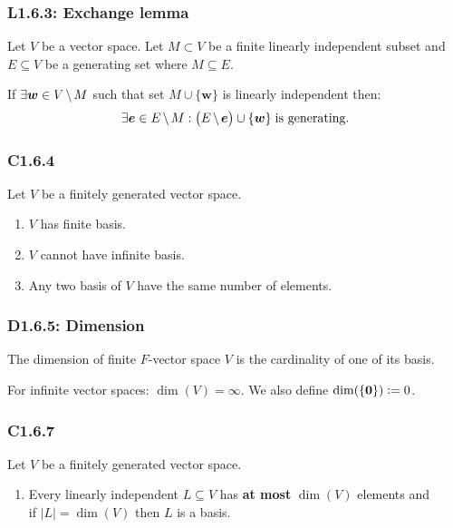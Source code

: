 \documentclass{article}
\newcommand{\deq}{\vcentcolon=}
\newcommand{\vc}[1]{\boldsymbol{#1}}
\begin{document}
\begin{multicols*}{3}
\subsubsection*{L1.6.3: Exchange lemma}
Let $V$ be a vector space. Let $M\subset V$ be a finite
linearly independent subset and $E\subseteq V$
be a generating set where $M\subseteq E$.

If $\exists\vc{w}\in V\hspace{0.02in}\backslash\hspace{0.02in} M$
such that set $M\cup\{\vc{w}\}$ is linearly independent then:
$$\exists\vc{e}\in E\hspace{0.02in}\backslash\hspace{0.02in} M:
\bigl(E\hspace{0.02in}\backslash\hspace{0.02in}
\vc{e}\bigr)\cup\{\vc{w}\}\hspace{0.04in}\text{is generating.}$$

\subsubsection*{C1.6.4}
Let $V$ be a finitely generated vector space.
\begin{enumerate}
    \item $V$ has finite basis.
    
    \item $V$ cannot have infinite basis.
    
    \item Any two basis of $V$ have the
    same number of elements.
\end{enumerate}

\subsubsection*{D1.6.5: Dimension}
The dimension of finite $F$-vector space $V$ is the
cardinality of one of its basis. 

For infinite vector spaces: $\dim(V)=\infty$.
We also define $\dim(\{\vc{0}\})\deq0$.

\subsubsection*{C1.6.7}
Let $V$ be a finitely generated vector space.
\begin{enumerate}
    \item Every linearly independent $L\subseteq V$
    has \textbf{at most} $\dim(V)$ elements and \\
    if $|L|=\dim(V)$ then $L$ is a basis.


\end{enumerate}
\end{multicols*}
\end{document}
